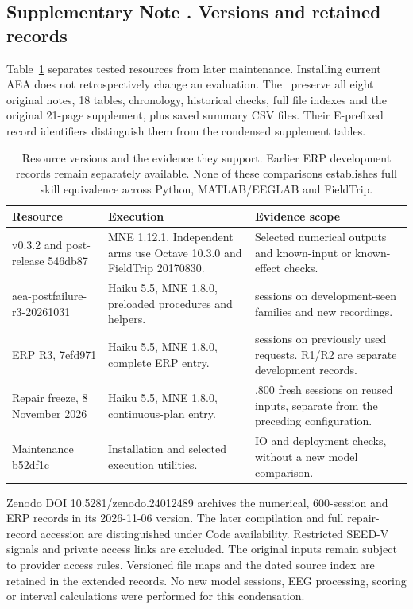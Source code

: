 \subsection*{Supplementary Note \thesuppnote. Versions and retained records}
\label{si:sources}

Table~\ref*{tab:version-routes} separates tested resources from later maintenance. Installing current AEA does not retrospectively change an evaluation. The \extendedrecords\ preserve all eight original notes, 18 tables, chronology, historical checks, full file indexes and the original 21-page supplement, plus saved summary CSV files. Their E-prefixed record identifiers distinguish them from the condensed supplement tables.

\begin{table}[!htbp]
\centering\small
\caption{Resource versions and the evidence they support. Earlier ERP development records remain separately available. None of these comparisons establishes full skill equivalence across Python, MATLAB/EEGLAB and FieldTrip.}
\label{tab:version-routes}
\begin{tabular}{>{\raggedright\arraybackslash}p{4.0cm}>{\raggedright\arraybackslash}p{4.4cm}>{\raggedright\arraybackslash}p{6.1cm}}
\toprule
Resource & Execution & Evidence scope\\
\midrule
v0.3.2 and post-release 546db87 & MNE 1.12.1. Independent arms use Octave 10.3.0 and FieldTrip 20170830. & Selected numerical outputs and known-input or known-effect checks.\\
aea-postfailure-r3-20261031 & Haiku 5.5, MNE 1.8.0, preloaded procedures and helpers. & 600 sessions on development-seen families and new recordings.\\
ERP R3, 7efd971 & Haiku 5.5, MNE 1.8.0, complete ERP entry. & 144 sessions on previously used requests. R1/R2 are separate development records.\\
Repair freeze, 8 November 2026 & Haiku 5.5, MNE 1.8.0, continuous-plan entry. & 1,800 fresh sessions on reused inputs, separate from the preceding configuration.\\
Maintenance b52df1c & Installation and selected execution utilities. & IO and deployment checks, without a new model comparison.\\
\bottomrule
\end{tabular}
\end{table}

Zenodo DOI 10.5281/zenodo.24012489 archives the numerical, 600-session and ERP records in its 2026-11-06 version. The later compilation and full repair-record accession are distinguished under Code availability. Restricted SEED-V signals and private access links are excluded. The original inputs remain subject to provider access rules. Versioned file maps and the dated source index are retained in the extended records. No new model sessions, EEG processing, scoring or interval calculations were performed for this condensation.

